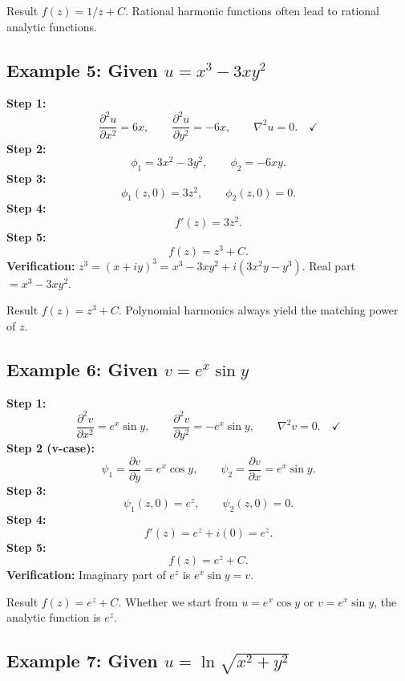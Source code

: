 \documentclass[12pt,a4paper]{article}
\begin{document}
\begin{learnbox}{Result}
\( f(z) = 1/z + C \). Rational harmonic functions often lead to rational analytic functions.
\end{learnbox}

\subsection*{Example 5: Given \( u = x^3 - 3xy^2 \)}

\textbf{Step 1:}
\[
\frac{\partial^2 u}{\partial x^2} = 6x, \qquad \frac{\partial^2 u}{\partial y^2} = -6x, \qquad \nabla^2 u = 0. \quad \checkmark
\]
\textbf{Step 2:}
\[
\phi_1 = 3x^2 - 3y^2, \qquad \phi_2 = -6xy.
\]
\textbf{Step 3:}
\[
\phi_1(z,0) = 3z^2, \qquad \phi_2(z,0) = 0.
\]
\textbf{Step 4:}
\[
f'(z) = 3z^2.
\]
\textbf{Step 5:}
\[
f(z) = z^3 + C.
\]
\textbf{Verification:} \( z^3 = (x+iy)^3 = x^3-3xy^2 + i(3x^2y-y^3) \). Real part \( = x^3-3xy^2 \). \checkmark

\begin{learnbox}{Result}
\( f(z) = z^3 + C \). Polynomial harmonics always yield the matching power of \( z \).
\end{learnbox}

\subsection*{Example 6: Given \( v = e^x \sin y \)}

\textbf{Step 1:}
\[
\frac{\partial^2 v}{\partial x^2} = e^x\sin y, \qquad \frac{\partial^2 v}{\partial y^2} = -e^x\sin y, \qquad \nabla^2 v = 0. \quad \checkmark
\]
\textbf{Step 2 (v-case):}
\[
\psi_1 = \frac{\partial v}{\partial y} = e^x\cos y, \qquad \psi_2 = \frac{\partial v}{\partial x} = e^x\sin y.
\]
\textbf{Step 3:}
\[
\psi_1(z,0) = e^z, \qquad \psi_2(z,0) = 0.
\]
\textbf{Step 4:}
\[
f'(z) = e^z + i(0) = e^z.
\]
\textbf{Step 5:}
\[
f(z) = e^z + C.
\]
\textbf{Verification:} Imaginary part of \( e^z \) is \( e^x \sin y = v \). \checkmark

\begin{learnbox}{Result}
\( f(z) = e^z + C \). Whether we start from \( u = e^x\cos y \) or \( v = e^x \sin y \), the analytic function is \( e^z \).
\end{learnbox}

\subsection*{Example 7: Given \( u = \ln\!\sqrt{x^2+y^2} \)}
\end{document}
